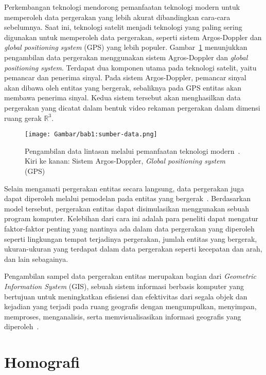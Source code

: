 Perkembangan teknologi mendorong pemanfaatan teknologi modern untuk memperoleh data pergerakan yang lebih akurat dibandingkan cara-cara sebelumnya. Saat ini, teknologi satelit menjadi teknologi yang paling sering digunakan untuk memperoleh data pergerakan, seperti sistem Argos-Doppler dan \textit{global positioning system} (GPS) yang lebih populer. Gambar~\ref{bab2:sumber-data} menunjukkan pengambilan data pergerakan menggunakan sistem Agros-Doppler dan \textit{global positioning system}. Terdapat dua komponen utama pada teknologi satelit, yaitu pemancar dan penerima sinyal. Pada sistem Argos-Doppler, pemancar sinyal akan dibawa oleh entitas yang bergerak, sebaliknya pada GPS entitas akan membawa penerima sinyal. Kedua sistem tersebut akan menghasilkan data pergerakan yang dicatat dalam bentuk video rekaman pergerakan dalam dimensi ruang gerak $\mathbb{R}^3$.

\begin{figure}[htbp]
    \centering
    \texttt{[image: Gambar/bab1:sumber-data.png]}
    \caption[Teknologi pengambilan data lintasan]{Pengambilan data lintasan melalui pemanfaatan teknologi modern~\cite{carter:argos}. Kiri ke kanan: Sistem Argos-Doppler, \textit{Global positioning system} (GPS)}
    \label{bab2:sumber-data}
\end{figure}

Selain mengamati pergerakan entitas secara langsung, data pergerakan juga dapat diperoleh melalui pemodelan pada entitas yang bergerak~\cite{wiratma:trajectory}. Berdasarkan model tersebut, pergerakan entitas dapat disimulasikan menggunakan sebuah program komputer. Kelebihan dari cara ini adalah para peneliti dapat mengatur faktor-faktor penting yang nantinya ada dalam data pergerakan yang diperoleh seperti lingkungan tempat terjadinya pergerakan, jumlah entitas yang bergerak, ukuran-ukuran yang terdapat dalam data pergerakan seperti kecepatan dan arah, dan lain sebagainya. 

Pengambilan sampel data pergerakan entitas merupakan bagian dari \textit{Geometric Information System} (GIS), sebuah sistem informasi berbasis komputer yang bertujuan untuk meningkatkan efisiensi dan efektivitas dari segala objek dan kejadian yang terjadi pada ruang geografis dengan mengumpulkan, menyimpan, memproses, menganalisis, serta memvisualisasikan informasi geografis yang diperoleh~\cite{longley:02:gis}.

\section{Homografi}
\label{sec:homography}

